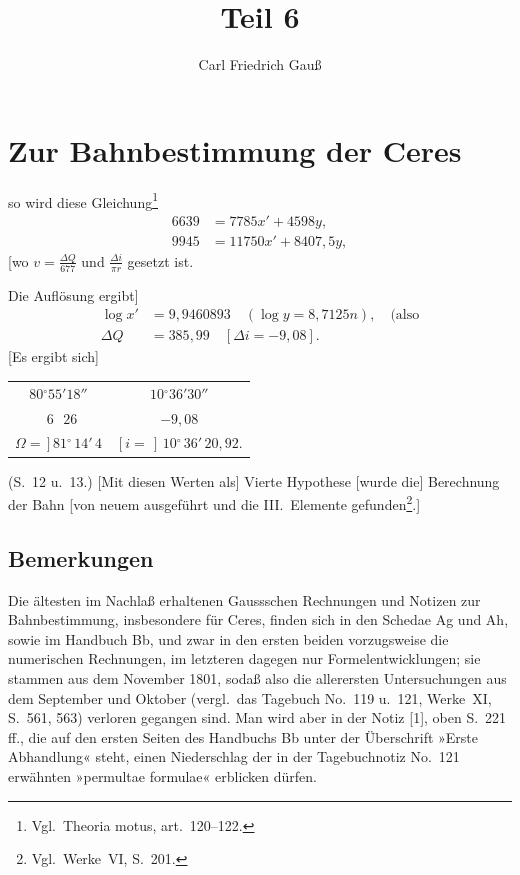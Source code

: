 \documentclass[12pt,a4paper]{article}
\title{Teil 6}
\author{Carl Friedrich Gau\ss}
\date{}
\newcommand{\degree}{\ensuremath{^\circ}}
\theoremstyle{plain}
\theoremstyle{definition}
\theoremstyle{remark}
\begin{document}
\maketitle

\section*{Zur Bahnbestimmung der Ceres}

so wird diese Gleichung\footnote{Vgl.\ Theoria motus, art.~120--122.}
\begin{align*}
6639 &= 7785x' + 4598y,\\
9945 &= 11750x' + 8407{,}5y,
\end{align*}
[wo $v = \frac{\Delta Q}{677}$ und $\frac{\Delta i}{\pi r}$ gesetzt ist.

Die Auflösung ergibt]
\begin{align*}
\log x' &= 9{,}9460893\quad (\log y = 8{,}7125n),\quad\text{(also}\\
\Delta Q &= 385{,}99\quad [\Delta i = -9{,}08].
\end{align*}
[Es ergibt sich]
\begin{center}
\begin{tabular}{c|c}
$80\degree55'18''$ & $10\degree36'30''$ \\
$\phantom{0}6\phantom{\degree}\,\,26$ & $-9{,}08$ \\
\hline
$\Omega = \,]\,81\degree\,14'\,4$ & $[i = \,]\,10\degree\,36'\,20{,}92$.
\end{tabular}
\end{center}

(S.~12 u.~13.) [Mit diesen Werten als] Vierte Hypothese [wurde die] Berechnung der Bahn [von neuem ausgeführt und die III.~Elemente gefunden\footnote{Vgl.\ Werke~VI, S.~201.}.]

\subsection*{Bemerkungen}

Die ältesten im Nachlaß erhaltenen Gaussschen Rechnungen und Notizen zur Bahnbestimmung, insbesondere für Ceres, finden sich in den Schedae Ag und Ah, sowie im Handbuch Bb, und zwar in den ersten beiden vorzugsweise die numerischen Rechnungen, im letzteren dagegen nur Formelentwicklungen; sie stammen aus dem November 1801, sodaß also die allerersten Untersuchungen aus dem September und Oktober (vergl.\ das Tagebuch No.~119 u.~121, Werke~XI, S.~561, 563) verloren gegangen sind. Man wird aber in der Notiz [1], oben S.~221 ff., die auf den ersten Seiten des Handbuchs Bb unter der Überschrift »Erste Abhandlung« steht, einen Niederschlag der in der Tagebuchnotiz No.~121 erwähnten »permultae formulae« erblicken dürfen.
\end{document}
